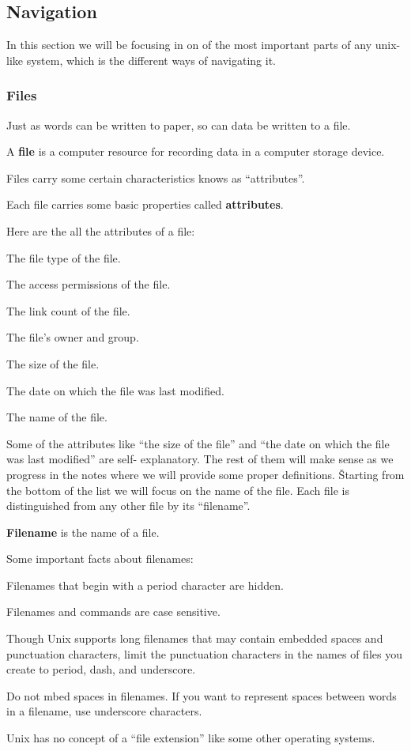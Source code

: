 \subsection{Navigation}

In this section we will be focusing in on of the most important parts of any unix-like system, which is the different
ways of navigating it.

\subsubsection{Files}

Just as words can be written to paper, so can data be written to a file.

\bd[File]
A \textbf{file} is a computer resource for recording data in a computer storage device.
\ed

Files carry some certain characteristics knows as ``attributes''.

\bd[Attribute]
Each file carries some basic properties called \textbf{attributes}.
\ed

Here are the all the attributes of a file:
\bit
\item The file type of the file.
\item The access permissions of the file.
\item The link count of the file.
\item The file's owner and group.
\item The size of the file.
\item The date on which the file was last modified.
\item The name of the file.
\eit

Some of the attributes like ``the size of the file'' and ``the date on which the file was last modified'' are self-
explanatory. The rest of them will make sense as we progress in the notes where we will provide some proper definitions.
\v

Starting from the bottom of the list we will focus on the name of the file. Each file is distinguished from any other
file by its ``filename''.

\bd[Filename]
\textbf{Filename} is the name of a file.
\ed

Some important facts about filenames:
\bit
\item Filenames that begin with a period character are hidden.
\item Filenames and commands are case sensitive.
\item Though Unix supports long filenames that may contain embedded spaces and punctuation characters, limit the
punctuation characters in the names of files you create to period, dash, and underscore.
\item Do not mbed spaces in filenames. If you want to represent spaces between words in a filename, use underscore
characters.
\item Unix has no concept of a ``file extension'' like some other operating systems.
\eit

